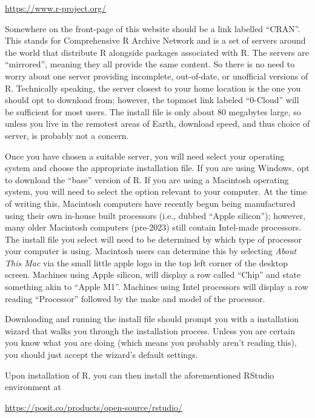 \begin{center}
\url{https://www.r-project.org/}
\end{center}

\noindent
Somewhere on the front-page of this website should be a link labelled ``\acrshort{CRAN}''. This stands for \gls{Comprehensive R Archive Network} and is a set of servers around the world that distribute R alongside packages associated with R.  The servers are ``mirrored'', meaning they all provide the same content.  So there is no need to worry about one server providing incomplete, out-of-date, or unofficial versions of R.  Technically speaking, the server closest to your home location is the one you should opt to download from; however, the topmost link labeled ``0-Cloud'' will be sufficient for most users.  The install file is only about 80 megabytes large, so unless you live in the remotest areas of Earth, download speed, and thus choice of server, is probably not a concern.

Once you have chosen a suitable server, you will need select your operating system and choose the appropriate installation file. If you are using Windows, opt to download the ``base'' version of R.  If you are using a Macintosh operating system, you will need to select the option relevant to your computer.  At the time of writing this, Macintosh computers have recently begun being manufactured using their own in-house built processors (i.e., dubbed ``Apple silicon''); however, many older Macintosh computers (pre-2023) still contain Intel-made processors. The install file you select will need to be determined by which type of processor your computer is using. Macintosh users can determine this by selecting \textit{About This Mac} via the small little apple logo in the top left corner of the desktop screen. Machines using Apple silicon, will display a row called ``Chip'' and state something akin to ``Apple M1''. Machines using Intel processors will display a row reading ``Processor'' followed by the make and model of the processor.

Downloading and running the install file should prompt you with a installation wizard that walks you through the installation process. Unless you are certain you know what you are doing (which means you probably aren't reading this), you should just accept the wizard's default settings.

Upon installation of R, you can then install the aforementioned RStudio environment at

\begin{center}
\url{https://posit.co/products/open-source/rstudio/}
\end{center}

